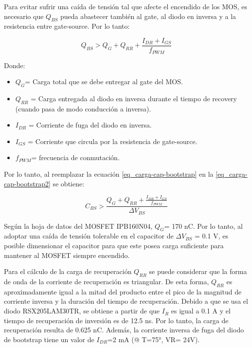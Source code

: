 \noindent Para evitar sufrir una caída de tensión tal que afecte el encendido de los MOS, es necesario que $Q_{BS}$ pueda abastecer también al gate, al diodo en inversa y a la resistencia entre gate-source. Por lo tanto:

\begin{equation} \label{eq_carga-cap-bootstrap2}
Q_{BS} > Q_G + Q_{RR} + \frac{I_{DR}+I_{GS}}{f_{PWM}}
\end{equation}

\noindent Donde:
\begin{itemize}
\item $Q_G$= Carga total que se debe entregar al gate del MOS.
\item $Q_{RR}$ = Carga entregada al diodo en inversa durante el tiempo de recovery (cuando pasa de modo conducción a inversa).
\item $I_{DR}$ = Corriente de fuga del diodo en inversa.
\item $I_{GS}$ = Corriente que circula por la resistencia de gate-source.
\item $f_{PWM}$= frecuencia de conmutación.
\end{itemize}


\noindent Por lo tanto, al reemplazar la ecuación \ref{eq_carga-cap-bootstrap} en la \ref{eq_carga-cap-bootstrap2} se obtiene:


\begin{equation} \label{eq_cap-bootstrap}
C_{BS} > \frac{Q_G+Q_{RR} + \frac{I_{DR}+I_{GS}}{f_{PWM}}}{\Delta V_{BS}}
\end{equation}

\noindent Según la hoja de datos \cite{IPB160N04} del MOSFET IPB160N04, $Q_G$= 170 nC. Por lo tanto, al adoptar una caída de tensión tolerable en el capacitor de $\Delta V_{BS}$ = 0.1 V, es posible dimensionar el capacitor para que este posea carga suficiente para mantener al MOSFET siempre encendido.

\noindent Para el cálculo de la carga de recuperación $Q_{RR}$ se puede considerar que la forma de onda de la corriente de recuperación es triangular. De esta forma,  $Q_{RR}$ es aproximadamente igual a la mitad del producto entre el pico de la magnitud de corriente inversa y la duración del tiempo de recuperación.  Debido a que se usa el diodo RSX205LAM30TR, se obtiene a partir de \cite{RSX205LAM30} que  $I_R$ es igual a 0.1 A  y  el tiempo de recuperación de inversión es de 12.5 ns. Por lo tanto, la carga de recuperación resulta de 0.625 nC. Además, la corriente inversa de fuga del diodo de bootstrap tiene un valor de $I_{DR}$=2 mA (@ T=75°, VR= 24V).

